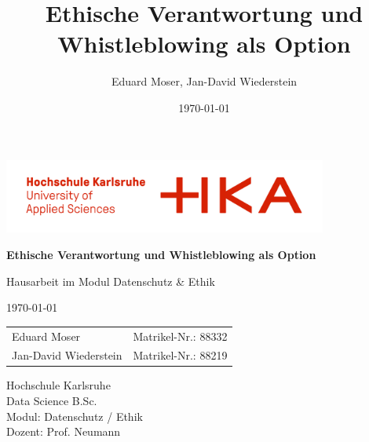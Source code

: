 \documentclass[
    12pt,               %
    a4paper,            %
    ngerman             %
]{scrartcl}
\title{Ethische Verantwortung und Whistleblowing als Option}
\author{Eduard Moser, Jan-David Wiederstein}
\date{\today}
\begin{document}
\begin{titlepage}
    \centering
    
    \vfill 
    \includegraphics[width=0.8\textwidth]{logo.png}\par\vspace{1cm}
    
    {\Huge \bfseries Ethische Verantwortung und Whistleblowing als Option\par} 
    
    \vspace{0.5cm}
    
    {\LARGE Hausarbeit im Modul Datenschutz \& Ethik\par} 

    \vspace{0.5cm}

    {\large \today\par} 

    \vspace{1.5cm} 

    \large
    \begin{tabular}{l l}
        Eduard Moser & Matrikel-Nr.: 88332 \\
        Jan-David Wiederstein & Matrikel-Nr.: 88219 \\
    \end{tabular}

    \vfill

    {\normalsize
    Hochschule Karlsruhe \\
    Data Science B.Sc. \\
    Modul: Datenschutz / Ethik \\
    Dozent: Prof. Neumann
    \par}
    
\end{titlepage}

\end{document}
